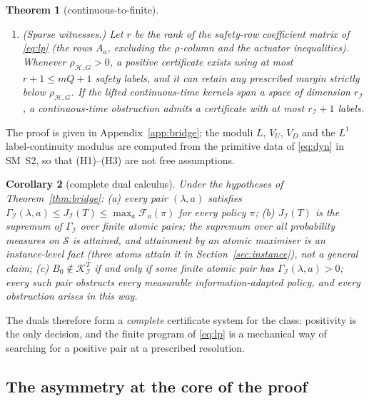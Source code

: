 \documentclass[11pt,a4paper]{article}
\theoremstyle{plain}
\newtheorem{theorem}{Theorem}[section]
\newtheorem{corollary}[theorem]{Corollary}
\theoremstyle{definition}
\theoremstyle{remark}
\newcommand{\N}{\mathbb{N}}
\newcommand{\calI}{\mathcal{I}}
\newcommand{\calH}{\mathcal{H}}
\newcommand{\calK}{\mathcal{K}}
\newcommand{\calF}{\mathcal{F}}
\newcommand{\calS}{\mathscr{S}}
\newcommand{\J}{J_{\calI}(T)}
\newcommand{\Gam}{\Gamma_{\calI}}
\newcommand{\rhoHG}{\rho_{\calH,G}}
\begin{document}
\begin{theorem}[continuous-to-finite]
\begin{enumerate}[label=\textup{(\roman*)},leftmargin=2.4em,itemsep=2pt]
\begin{equation}
\J=\sup\bigl\{\Gam(\lambda,a):\ q\in\N,\ a_1,\dots,a_q\in\calS,\ \lambda\in\Delta_q\bigr\}.
\end{equation}
In particular, nonviability is equivalent to the existence of a positive finite atomic certificate.
\item \textup{(Sparse witnesses.)} Let $r$ be the rank of the safety-row coefficient matrix of \eqref{eq:lp} (the rows $A_a$, excluding the $\rho$-column and the actuator inequalities). Whenever $\rhoHG>0$, a positive certificate exists using at most $r+1\le mQ+1$ safety labels, and it can retain any prescribed margin strictly below $\rhoHG$. If the lifted continuous-time kernels span a space of dimension $r_\calI$, a continuous-time obstruction admits a certificate with at most $r_\calI+1$ labels.
\end{enumerate}
\end{theorem}

The proof is given in Appendix~\ref{app:bridge}; the moduli $L$, $V_U$, $V_D$ and the $L^1$ label-continuity modulus are computed from the primitive data of \eqref{eq:dyn} in SM~S2, so that (H1)--(H3) are not free assumptions.

\begin{corollary}[complete dual calculus]\label{cor:dual}
Under the hypotheses of Theorem~\ref{thm:bridge}:
\textup{(a)} every pair $(\lambda,a)$ satisfies $\Gam(\lambda,a)\le\J\le\max_a\calF_a(\pi)$ for every policy $\pi$;
\textup{(b)} $\J$ is the supremum of $\Gam$ over finite atomic pairs; the supremum over all probability measures on $\calS$ is attained, and attainment by an atomic maximiser is an instance-level fact (three atoms attain it in Section~\ref{sec:instance}), not a general claim;
\textup{(c)} $B_0\notin\calK^T_\calI$ if and only if some finite atomic pair has $\Gam(\lambda,a)>0$; every such pair obstructs every measurable information-adapted policy, and every obstruction arises in this way.
\end{corollary}

The duals therefore form a \emph{complete} certificate system for the class: positivity is the only decision, and the finite program of \eqref{eq:lp} is a mechanical way of searching for a positive pair at a prescribed resolution.

\subsection{The asymmetry at the core of the proof}
\end{document}
